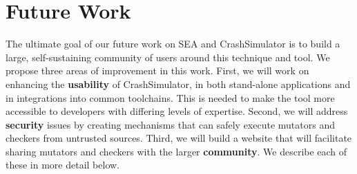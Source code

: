 \section{Future Work}
\label{sec:future-work}

The ultimate goal of our future work on SEA and CrashSimulator is to build
a large, self-sustaining community of users around this technique and tool.
%
%
%
%
%
%
We propose three areas of improvement in this work.  First, we
will work on enhancing the {\bf usability} of CrashSimulator, in both stand-alone
applications and in integrations into common toolchains.
This is needed
to make the tool more accessible to developers with differing levels of
expertise.
Second, we will address {\bf security} issues by creating
mechanisms that can safely execute mutators and checkers from
untrusted sources.
Third, we will build a website that will facilitate sharing mutators and
checkers with the larger {\bf community}.
We describe each of these in more detail below.


